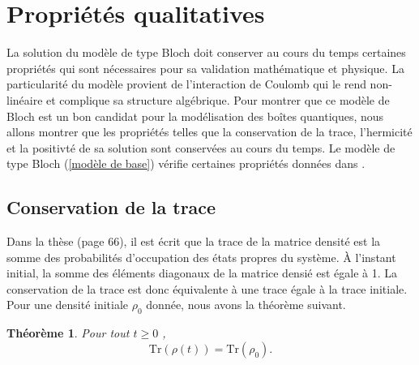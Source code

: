 \documentclass[12pt,a4paper,openany,oneside]{book}
\newtheorem{theorem}{Théorème}[chapter]
\begin{document}
{{{{{{\section{Propriétés qualitatives} \label{section proprietes qualitatives}
La solution du modèle de type Bloch  doit conserver au cours du temps certaines propriétés qui sont
nécessaires pour sa validation mathématique et physique. La particularité du modèle provient de l’interaction de Coulomb qui le rend non-linéaire et complique sa structure algébrique. 
Pour montrer que ce modèle de Bloch est un bon candidat pour la modélisation des boîtes quantiques, nous allons montrer que les propriétés telles que la conservation de
la trace, l’hermicité et la positivté de sa solution sont conservées au cours du temps. 
Le modèle de type Bloch (\ref{modèle de base}) vérifie certaines propriétés données dans \cite{mareference1}.

\subsection{Conservation de la trace}

Dans la thèse \cite{mareference1} (page 66), il est écrit que la trace de la matrice densité est la somme des probabilités d’occupation des états propres du système.
\`{A} l’instant initial, la somme des éléments diagonaux de la matrice densié est égale à 1.
La conservation de la trace est donc équivalente à une trace égale à la trace initiale.\\
Pour une densité initiale $\rho_{0}$ donnée, nous avons la théorème suivant.

\begin{theorem}
 Pour tout $ t\geq 0$ , 
 $$ \textrm{Tr}(\rho(t))= \textrm{Tr}(\rho_{0}).$$
\end{theorem}

}}}}}}
\end{document}
